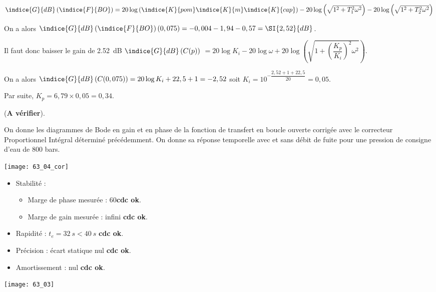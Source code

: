 $\indice{G}{dB}\left(\indice{F}{BO}\right)=20\log\left(\indice{K}{pom}\indice{K}{m}\indice{K}{cap}\right)
-20\log\left(\sqrt{1^2+T_1^2\omega^2}\right)-20\log\left(\sqrt{1^2+T_2^2\omega^2}\right)$

On a alors $\indice{G}{dB}\left(\indice{F}{BO}\right)(0,075) = -0,004-1,94-0,57=\SI{2,52}{dB}$.

Il faut donc baisser le gain de \SI{2,52}{dB}
$\indice{G}{dB}\left(C(p)\right)$  
$= 20\log K_i -20\log \omega +20\log\left(\sqrt{1+\left(\dfrac{K_p}{K_i}\right)^2\omega^2}\right) $.

On a alors $\indice{G}{dB}\left(C(0,075)\right) = 20\log K_i +22,5+1 = -2,52$ soit $K_i = 10^{-\dfrac{2,52+1+22,5}{20}  } =0,05$.

Par suite, $K_p = 6,79 \times 0,05 = 0,34$.

(\textbf{A vérifier}).

\else 

On donne les diagrammes de Bode en gain et en phase de la fonction de transfert en boucle ouverte corrigée avec le correcteur Proportionnel Intégral déterminé précédemment. On donne sa réponse temporelle avec et sans débit de fuite pour une pression de consigne d’eau de 800 bars.

\fi



\ifprof
\begin{marginfigure}
\texttt{[image: 63\_04\_cor]}
\end{marginfigure}
\begin{itemize}
\item Stabilité : 
\begin{itemize}
\item Marge de phase mesurée :  60\degres \textbf{cdc ok}.
\item Marge de gain mesurée :   infini \textbf{cdc ok}.
\end{itemize}
\item Rapidité : $ t_e = \SI{32}{s} < \SI{40}{s}$ \textbf{cdc ok}.
\item Précision :  écart statique nul \textbf{cdc ok}.
\item Amortissement :  nul \textbf{cdc ok}.
\end{itemize}
\else 
\fi

\ifprof
\else

\begin{marginfigure}
\texttt{[image: 63\_03]}
\end{marginfigure}



